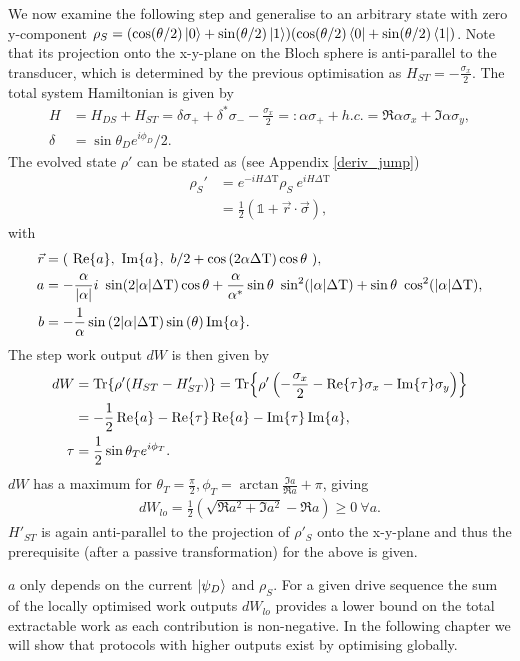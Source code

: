 We now examine the following step and generalise to an arbitrary state with zero y-component $\rho_S = (\cos(\theta/2) \ket{0} + \sin(\theta/2) \ket{1})(\cos(\theta/2) \bra{0} + \sin(\theta/2) \bra{1})$.
Note that its projection onto the x-y-plane on the Bloch sphere is anti-parallel to the transducer, which is determined by the previous optimisation as $H_{ST} = -\frac{\sigma_x}{2}$.
The total system Hamiltonian is given by
\begin{align*}
H &= H_{DS} + H_{ST} =  \delta \sigma_+ + \delta^* \sigma_{-} - \frac{\sigma_x}{2} =: \alpha \sigma_+ + h.c. = \Re{\alpha} \sigma_x + \Im{\alpha} \sigma_y, \\
\delta &= \sin{\theta_D} e^{i\phi_D} / 2.
\end{align*}
The evolved state $\rho'$ can be stated as (see Appendix \ref{deriv_jump})
\begin{align*}
\rho_S' &= e^{-iH\Delta \mathrm{T}} \rho_S \ e^{iH\Delta \mathrm{T}} \\
&=\frac{1}{2} (\mathds{1} + \vec{r} \cdot \vec{\sigma}),       
\end{align*}
with
\begin{align*}
\vec{r} &= ( \ \Re{a}, \ \Im{a}, \ b/2 + \cos{(2 \alpha \Delta \mathrm{T})} \cos{\theta} \ ), \\
a &= -\frac{\alpha}{\abs{\alpha}} i \ \sin(2 \abs{\alpha} \Delta \mathrm{T}) \cos{\theta} + \frac{\alpha}{\alpha^*} \sin{\theta} \ \sin^2(\abs{\alpha} \Delta \mathrm{T}) + \sin{\theta} \ \cos^2(\abs{\alpha} \Delta \mathrm{T}), \\
b &= -\frac{1}{\alpha} \sin{(2 \abs{\alpha} \Delta \mathrm{T})} \sin{(\theta)} \Im{\alpha}.
\end{align*}
The step work output $dW$ is then given by
\begin{align*}
dW &= \Tr{\rho' (H_{ST} - H'_{ST})} = \Tr{\rho' \left(-\frac{\sigma_x}{2} - \Re{\tau} \sigma_x - \Im{\tau} \sigma_y \right)} \\
&= -\frac{1}{2} \Re{a} - \Re{\tau}\Re{a} - \Im{\tau} \Im{a}, \\
\tau &= \frac{1}{2} \sin{\theta_T} e^{i\phi_T}. 
\end{align*}
$dW$ has a maximum for $\theta_T = \frac{\pi}{2}, \phi_T = \arctan{\frac{\Im{a}}{\Re{a}}} + \pi$, giving
\begin{align*}
dW_{lo} = \frac{1}{2}\left(\sqrt{\Re{a}^2 + \Im{a}^2} -\Re{a}\right) \geq 0 \ \forall a.
\end{align*}
$H'_{ST}$ is again anti-parallel to the projection of $\rho'_S$ onto the x-y-plane and thus the prerequisite (after a passive transformation) for the above is given.

$a$ only depends on the current $\ket{\psi_D}$ and $\rho_S$.
For a given drive sequence the sum of the locally optimised work outputs $dW_{lo}$ provides a lower bound on the total extractable work as each contribution is non-negative. In the following chapter we will show that protocols with higher outputs exist by optimising globally.